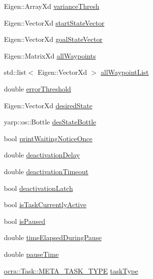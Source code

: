 \begin{DoxyCompactItemize}
\item 
Eigen\+::\+Array\+Xd \hyperlink{classocra__recipes_1_1TrajectoryThread_a63dbf38d082f3ebcebaee867dba2a8ee}{variance\+Thresh}
\item 
Eigen\+::\+Vector\+Xd \hyperlink{classocra__recipes_1_1TrajectoryThread_a28661ee4345695282b2a45baf33bd2af}{start\+State\+Vector}
\item 
Eigen\+::\+Vector\+Xd \hyperlink{classocra__recipes_1_1TrajectoryThread_abb9ba9fef74e7336a325ad1183f4e090}{goal\+State\+Vector}
\item 
Eigen\+::\+Matrix\+Xd \hyperlink{classocra__recipes_1_1TrajectoryThread_a857686d75878a7ae4edf12e37fddb10c}{all\+Waypoints}
\item 
std\+::list$<$ Eigen\+::\+Vector\+Xd $>$ \hyperlink{classocra__recipes_1_1TrajectoryThread_a21821862b17ba40b639c35125611f9d4}{all\+Waypoint\+List}
\item 
double \hyperlink{classocra__recipes_1_1TrajectoryThread_a69ca8ea525dd7529fbeae6d8bb9529b3}{error\+Threshold}
\item 
Eigen\+::\+Vector\+Xd \hyperlink{classocra__recipes_1_1TrajectoryThread_a2f90808ce72fd5a3a5d0b5d576860564}{desired\+State}
\item 
yarp\+::os\+::\+Bottle \hyperlink{classocra__recipes_1_1TrajectoryThread_aae66d09e0f64c124428cebcdb53bdf33}{des\+State\+Bottle}
\item 
bool \hyperlink{classocra__recipes_1_1TrajectoryThread_a4dbc25516ce41a0bc82c49e004a1b933}{print\+Waiting\+Notice\+Once}
\item 
double \hyperlink{classocra__recipes_1_1TrajectoryThread_a98ffdc4593f0608e8355654b54191c21}{deactivation\+Delay}
\item 
double \hyperlink{classocra__recipes_1_1TrajectoryThread_ab4de56a2b92a1887e4d046d7fa70d721}{deactivation\+Timeout}
\item 
bool \hyperlink{classocra__recipes_1_1TrajectoryThread_a5bdb397e0f051c99e563074946e01a82}{deactivation\+Latch}
\item 
bool \hyperlink{classocra__recipes_1_1TrajectoryThread_a7f185a5b52a00b7e5bce78e5ffb77d97}{is\+Task\+Currently\+Active}
\item 
bool \hyperlink{classocra__recipes_1_1TrajectoryThread_a08dc8a4a78b61d6b3d1e38e82b809493}{is\+Paused}
\item 
double \hyperlink{classocra__recipes_1_1TrajectoryThread_a3aa38677a7e98b6a6deec0b29a903844}{time\+Elapsed\+During\+Pause}
\item 
double \hyperlink{classocra__recipes_1_1TrajectoryThread_a9436d523ebb66dfa9bbc8ed458306e46}{pause\+Time}
\item 
\hyperlink{classocra_1_1Task_a8ddf2840d178ca273e886c9ca95248fe}{ocra\+::\+Task\+::\+M\+E\+T\+A\+\_\+\+T\+A\+S\+K\+\_\+\+T\+Y\+PE} \hyperlink{classocra__recipes_1_1TrajectoryThread_a97b08a2471b425e49525b51c9e8eabb4}{task\+Type}
\end{DoxyCompactItemize}


